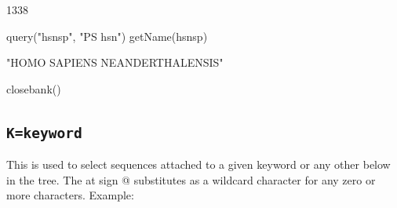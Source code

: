 \documentclass{article}
\begin{document}

\begin{Schunk}
\begin{Soutput}
[1] 1338
\end{Soutput}
\begin{Sinput}
 query("hsnsp", "PS hsn")
 getName(hsnsp)
\end{Sinput}
\begin{Soutput}
[1] "HOMO SAPIENS NEANDERTHALENSIS"
\end{Soutput}
\begin{Sinput}
 closebank()
\end{Sinput}
\end{Schunk}

\subsection{\texttt{K=keyword}}

This is used to select sequences attached to a given keyword or any other below in
the tree. The at sign @ substitutes as a wildcard character for any zero or more 
characters. Example:
\end{document}
